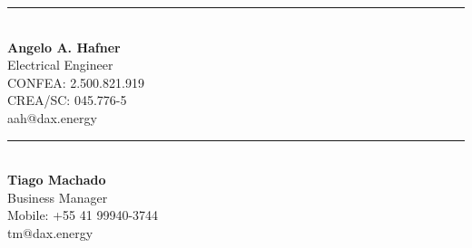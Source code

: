 \documentclass[a4paper]{article}
\begin{document}
	
	
	\noindent %
	\begin{minipage}[t]{0.5\textwidth} %
		\centering %
		\vspace{5cm} %
		\rule{6cm}{0.4pt}\\ %
		\textbf{Angelo A. Hafner}\\ %
		Electrical Engineer\\ %
		CONFEA: 2.500.821.919\\ %
		CREA/SC: 045.776-5\\ %
		aah@dax.energy %
	\end{minipage}%
	\hfill %
	\begin{minipage}[t]{0.5\textwidth} %
		\centering %
		\vspace{5cm} %
		\rule{6cm}{0.4pt}\\ %
		\textbf{Tiago Machado}\\ %
		Business Manager\\ %
		Mobile: +55 41 99940-3744\\ %
		tm@dax.energy %
	\end{minipage}
	
\end{document}
